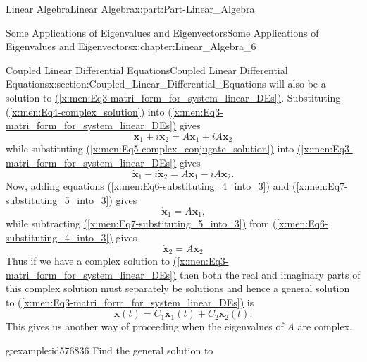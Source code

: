 \documentclass[oneside,10pt,]{book}
\newcommand{\xreffont}{\relax}
\numberwithin{equation}{section}
\newcommand{\bm}[1]{\boldsymbol{#1}}
\begin{document}
\begin{partptx}{Linear Algebra}{}{Linear Algebra}{}{}{x:part:Part-Linear_Algebra}
\begin{chapterptx}{Some Applications of Eigenvalues and Eigenvectors}{}{Some Applications of Eigenvalues and Eigenvectors}{}{}{x:chapter:Linear_Algebra_6}
\begin{sectionptx}{Coupled Linear Differential Equations}{}{Coupled Linear Differential Equations}{}{}{x:section:Coupled_Linear_Differential_Equations}
will also be a solution to \hyperref[x:men:Eq3-matri_form_for_system_linear_DEs]{({\xreffont\ref{x:men:Eq3-matri_form_for_system_linear_DEs}})}. Substituting \hyperref[x:men:Eq4-complex_solution]{({\xreffont\ref{x:men:Eq4-complex_solution}})} into \hyperref[x:men:Eq3-matri_form_for_system_linear_DEs]{({\xreffont\ref{x:men:Eq3-matri_form_for_system_linear_DEs}})} gives%
\begin{equation}
\dot{\bm{x}}_1 + i \dot{\bm{x}}_2 = A \bm{x}_1 + i A \bm{x}_2\label{x:men:Eq6-substituting_4_into_3}
\end{equation}
while substituting \hyperref[x:men:Eq5-complex_conjugate_solution]{({\xreffont\ref{x:men:Eq5-complex_conjugate_solution}})} into \hyperref[x:men:Eq3-matri_form_for_system_linear_DEs]{({\xreffont\ref{x:men:Eq3-matri_form_for_system_linear_DEs}})} gives%
\begin{equation}
\dot{\bm{x}}_1 - i \dot{\bm{x}}_2 = A \bm{x}_1 - i A \bm{x}_2\text{.}\label{x:men:Eq7-substituting_5_into_3}
\end{equation}
Now, adding equations \hyperref[x:men:Eq6-substituting_4_into_3]{({\xreffont\ref{x:men:Eq6-substituting_4_into_3}})} and \hyperref[x:men:Eq7-substituting_5_into_3]{({\xreffont\ref{x:men:Eq7-substituting_5_into_3}})} gives%
\begin{equation*}
\dot{\bm{x}}_1 = A \bm{x}_1\text{,}
\end{equation*}
while subtracting \hyperref[x:men:Eq7-substituting_5_into_3]{({\xreffont\ref{x:men:Eq7-substituting_5_into_3}})} from \hyperref[x:men:Eq6-substituting_4_into_3]{({\xreffont\ref{x:men:Eq6-substituting_4_into_3}})} gives%
\begin{equation*}
\dot{\bm{x}}_2 = A \bm{x}_2
\end{equation*}
Thus if we have a complex solution to \hyperref[x:men:Eq3-matri_form_for_system_linear_DEs]{({\xreffont\ref{x:men:Eq3-matri_form_for_system_linear_DEs}})} then both the real and imaginary parts of this complex solution must separately be solutions and hence a general solution to \hyperref[x:men:Eq3-matri_form_for_system_linear_DEs]{({\xreffont\ref{x:men:Eq3-matri_form_for_system_linear_DEs}})} is%
\begin{equation*}
\bm{x}(t) = C_1 \bm{x}_1(t) + C_2 \bm{x}_2(t)\text{.}
\end{equation*}
This gives us another way of proceeding when the eigenvalues of \(A\) are complex.%
\begin{example}{}{g:example:id576836}%
Find the general solution to%
\begin{equation*}

\end{equation*}
\end{example}
\end{sectionptx}
\end{chapterptx}
\end{partptx}
\end{document}
